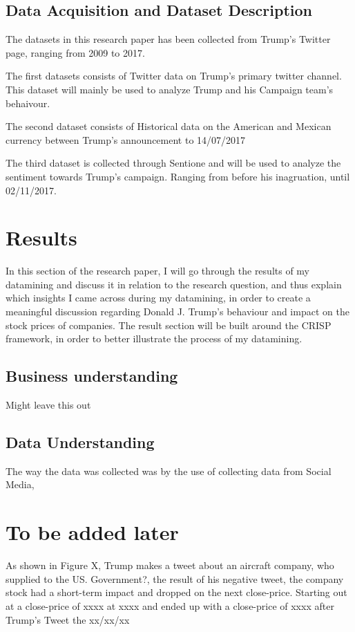 \documentclass{article}
\begin{document}
\subsection{Data Acquisition and Dataset Description}
The datasets in this research paper has been collected from Trump's Twitter page, ranging from 2009 to 2017.

The first datasets consists of Twitter data on Trump's primary twitter channel.  This dataset will mainly be used to analyze Trump and his Campaign team's behaivour. 

The second dataset consists of Historical data on the American and Mexican currency between Trump's announcement to  14/07/2017

The third dataset is collected through Sentione and will be used to analyze the sentiment towards Trump's campaign. Ranging from before his inagruation, until 02/11/2017. 

\cleardoublepage


\section{Results}
In this section of the research paper, I will go through the results of my datamining and discuss it in relation to the research question, and thus explain which insights I came across during my datamining, in order to create a meaningful discussion regarding Donald J. Trump's behaviour and impact on the stock prices of companies. The result section will be built around the CRISP framework, in order to better illustrate the process of my datamining.

\subsection{Business understanding}
Might leave this out

\subsection{Data Understanding}
The way the data was collected was by the use of collecting data from Social Media,

\section{To be added later}

As shown in Figure X, Trump makes a tweet about an aircraft company, who supplied to the US. Government?, the result of his negative tweet, the company stock had a short-term impact and dropped on the next close-price. Starting out at a close-price of xxxx at xxxx and ended up with a close-price of xxxx after Trump's Tweet the xx/xx/xx \\
\end{document}
